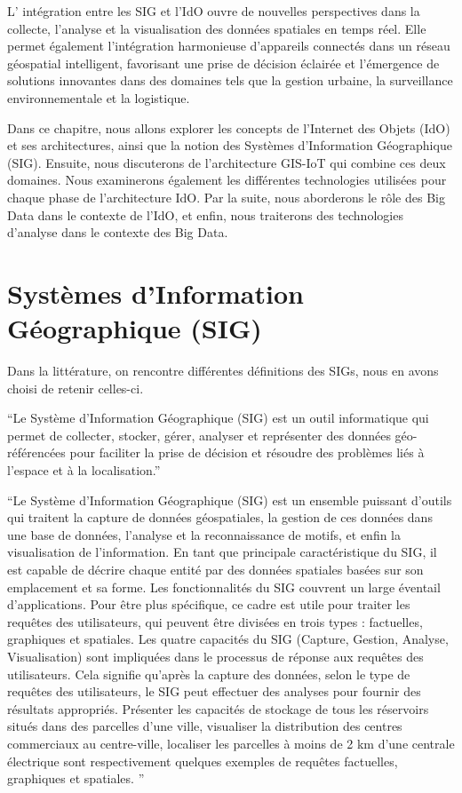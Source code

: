 \documentclass{report}
\begin{document}
\vspace*{0.3cm}

L’ intégration entre les SIG et l'IdO ouvre de nouvelles perspectives dans la collecte, l'analyse et la visualisation des données spatiales en temps réel. Elle permet également l'intégration harmonieuse d'appareils connectés dans un réseau géospatial intelligent, favorisant une prise de décision éclairée et l'émergence de solutions innovantes dans des domaines tels que la gestion urbaine, la surveillance environnementale et la logistique.

\vspace*{0.3cm}
Dans ce chapitre, nous allons explorer les concepts de l'Internet des Objets (IdO) et ses architectures, ainsi que la notion des Systèmes d'Information Géographique (SIG). Ensuite, nous discuterons de l'architecture GIS-IoT qui combine ces deux domaines. Nous examinerons également les différentes technologies utilisées pour chaque phase de l'architecture IdO. Par la suite, nous aborderons le rôle des Big Data dans le contexte de l'IdO, et enfin, nous traiterons des technologies d'analyse dans le contexte des Big Data.

\section{Systèmes d'Information Géographique (SIG)}
Dans la littérature, on rencontre différentes définitions des SIGs, nous en avons choisi de 
retenir celles-ci.

\enquote {Le Système d'Information Géographique (SIG) est un outil informatique qui permet de collecter, stocker, gérer, analyser et représenter des données géo-référencées pour faciliter la prise de décision et résoudre des problèmes liés à l'espace et à la localisation.}\cite{Ershad Ali ,2020}
\vspace*{0.2cm}

\enquote{Le Système d'Information Géographique (SIG) est un ensemble puissant d'outils qui traitent la capture de données géospatiales, la gestion de ces données dans une base de données, l'analyse et la reconnaissance de motifs, et enfin la visualisation de l'information.  En tant que principale caractéristique du SIG, il est capable de décrire chaque entité par des données spatiales basées sur son emplacement et sa forme. Les fonctionnalités du SIG couvrent un large éventail d'applications. Pour être plus spécifique, ce cadre est utile pour traiter les requêtes des utilisateurs, qui peuvent être divisées en trois types : factuelles, graphiques et spatiales. Les quatre capacités du SIG (Capture, Gestion, Analyse, Visualisation) sont impliquées dans le processus de réponse aux requêtes des utilisateurs. Cela signifie qu'après la capture des données, selon le type de requêtes des utilisateurs, le SIG peut effectuer des analyses pour fournir des résultats appropriés. Présenter les capacités de stockage de tous les réservoirs situés dans des parcelles d'une ville, visualiser la distribution des centres commerciaux au centre-ville, localiser les parcelles à moins de 2 km d'une centrale électrique sont respectivement quelques exemples de requêtes factuelles, graphiques et spatiales.
}\cite{Jalal Safari Bazargani and al.,2021}
\end{document}

